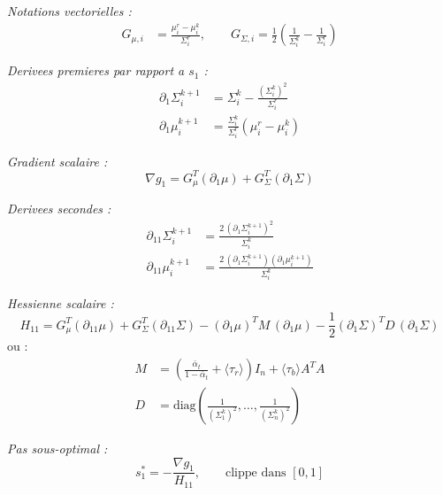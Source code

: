 \documentclass[12pt]{article}
\newcommand{\diag}{\mathrm{diag}}
\newcommand{\abar}{\bar{\alpha}}
\newcommand{\rapport}[1]{\textcolor{codeblue}{\textbf{[Rapport~eq.~#1]}}}
\begin{document}
\begin{resultbox}[Gradient et Hessienne de $g^{k+1}$ (cas 1D : $s_2 = 0$) \rapport{132--147}]

\textit{Notations vectorielles :}
\begin{align}
  G_{\mu,i} &= \frac{\mu_i^r - \mu_i^k}{\Sigma_i^r}, \qquad G_{\Sigma,i} = \frac{1}{2}\left(\frac{1}{\Sigma_i^k} - \frac{1}{\Sigma_i^r}\right) \label{eq:G}
\end{align}

\textit{Derivees premieres par rapport a $s_1$ :}
\begin{align}
  \partial_1 \Sigma_i^{k+1} &= \Sigma_i^k - \frac{(\Sigma_i^k)^2}{\Sigma_i^r} \label{eq:d1Sigma}\\
  \partial_1 \mu_i^{k+1} &= \frac{\Sigma_i^k}{\Sigma_i^r}\left(\mu_i^r - \mu_i^k\right) \label{eq:d1mu}
\end{align}

\textit{Gradient scalaire :}
\begin{equation}
  \nabla g_1 = G_\mu^T (\partial_1 \mu) + G_\Sigma^T (\partial_1 \Sigma) \label{eq:grad}
\end{equation}

\textit{Derivees secondes :}
\begin{align}
  \partial_{11} \Sigma_i^{k+1} &= \frac{2\,(\partial_1\Sigma_i^{k+1})^2}{\Sigma_i^k} \label{eq:d11Sigma}\\
  \partial_{11} \mu_i^{k+1} &= \frac{2\,(\partial_1\Sigma_i^{k+1})(\partial_1\mu_i^{k+1})}{\Sigma_i^k} \label{eq:d11mu}
\end{align}

\textit{Hessienne scalaire :}
\begin{equation}
  H_{11} = G_\mu^T(\partial_{11}\mu) + G_\Sigma^T(\partial_{11}\Sigma) - (\partial_1\mu)^T M\, (\partial_1\mu) - \frac{1}{2}(\partial_1\Sigma)^T D\, (\partial_1\Sigma) \label{eq:hess}
\end{equation}
ou :
\begin{align}
  M &= \left(\frac{\abar_t}{1-\abar_t} + \langle\tau_r\rangle\right) I_n + \langle\tau_b\rangle A^TA \label{eq:M}\\
  D &= \diag\!\left(\frac{1}{(\Sigma_1^k)^2}, \ldots, \frac{1}{(\Sigma_n^k)^2}\right) \label{eq:D}
\end{align}

\textit{Pas sous-optimal :}
\begin{equation}
  s_1^* = -\frac{\nabla g_1}{H_{11}}, \qquad \text{clippe dans } [0,1] \label{eq:s1}
\end{equation}
\end{resultbox}
\end{document}
